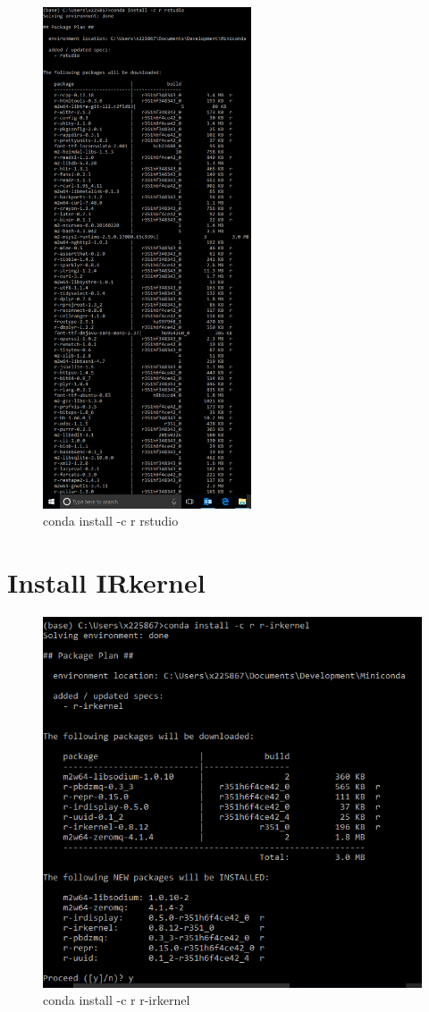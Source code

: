 \documentclass{report}
\begin{document}
\begin{figure}[H]
\centering
\includegraphics[width=0.55\textwidth]{./images/rstudio_install.PNG}
\caption{conda install -c r rstudio}
\end{figure}

\section*{Install IRkernel}

\begin{figure}[H]
\centering
\includegraphics{./images/irkernel_install.PNG}
\caption{conda install -c r r-irkernel}
\end{figure}
\end{document}
